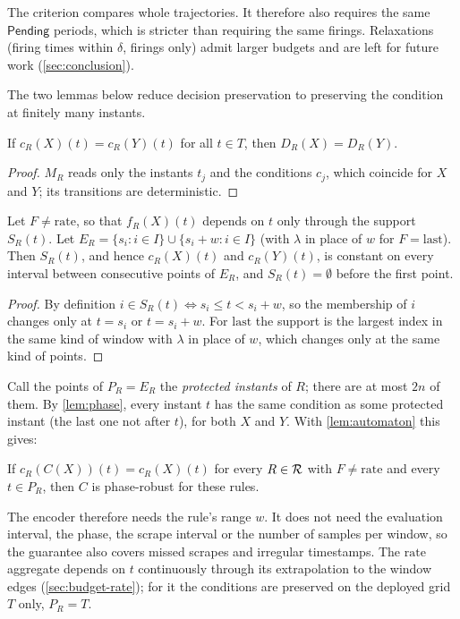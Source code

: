 The criterion compares whole trajectories. It therefore also requires
the same $\mathsf{Pending}$ periods, which is stricter than requiring the
same firings. Relaxations (firing times within $\delta$, firings only)
admit larger budgets and are left for future work
(\cref{sec:conclusion}).

The two lemmas below reduce decision preservation to preserving the
condition at finitely many instants.

\begin{lemma}[Automaton]
\label{lem:automaton}
If $c_R(X)(t) = c_R(Y)(t)$ for all $t \in T$, then $D_R(X) = D_R(Y)$.
\end{lemma}
\begin{proof}
$M_R$ reads only the instants $t_j$ and the conditions $c_j$, which coincide
for $X$ and $Y$; its transitions are deterministic.
\end{proof}

\begin{lemma}
\label{lem:phase}
Let $F \ne \mathrm{rate}$, so that $f_R(X)(t)$ depends on $t$ only through
the support $S_R(t)$. Let
$E_R = \{s_i : i \in I\} \cup \{s_i + w : i \in I\}$ (with $\lambda$ in
place of $w$ for $F = \mathrm{last}$). Then $S_R(t)$, and hence $c_R(X)(t)$
and $c_R(Y)(t)$, is constant on every interval between consecutive points
of $E_R$, and $S_R(t) = \emptyset$ before the first point.
\end{lemma}
\begin{proof}
By definition $i \in S_R(t) \iff s_i \le t < s_i + w$, so the membership of
$i$ changes only at $t = s_i$ or $t = s_i + w$. For $\mathrm{last}$ the
support is the largest index in the same kind of window with $\lambda$
in place of $w$, which changes only at the same kind of points.
\end{proof}

Call the points of $P_R = E_R$ the \emph{protected instants} of $R$; there
are at most $2n$ of them. By \cref{lem:phase}, every instant $t$ has the
same condition as some protected instant (the last one not after $t$), for
both $X$ and $Y$. With \cref{lem:automaton} this gives:

\begin{corollary}
\label{cor:protected}
If $c_R(C(X))(t) = c_R(X)(t)$ for every $R \in \mathcal{R}$ with
$F \ne \mathrm{rate}$ and every $t \in P_R$, then $C$ is phase-robust for
these rules.
\end{corollary}

The encoder therefore needs the rule's range $w$. It does not need the
evaluation interval, the phase, the scrape interval or the number of
samples per window, so the guarantee also covers missed scrapes and
irregular timestamps. The
$\mathrm{rate}$ aggregate depends on $t$ continuously through its
extrapolation to the window edges (\cref{sec:budget-rate}); for it the
conditions are preserved on the deployed grid $T$ only, $P_R = T$.
